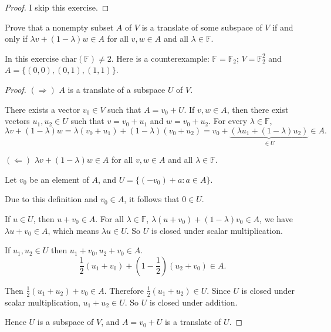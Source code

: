\begin{proof}
    I skip this exercise.
\end{proof}
\newpage

\begin{exercise}
    Prove that a nonempty subset $A$ of $V$ is a translate of some subspace of $V$ if and only if $\lambda v + (1 - \lambda)w\in A$ for all $v, w\in A$ and all $\lambda \in\mathbb{F}$.
\end{exercise}

In this exercise $\text{char}(\mathbb{F})\ne 2$. Here is a counterexample: $\mathbb{F} = \mathbb{F}_{2}$; $V = \mathbb{F}^{2}_{2}$ and $A = \{ (0,0), (0,1), (1,1) \}$.

\begin{proof}
    $(\Rightarrow)$ $A$ is a translate of a subspace $U$ of $V$.

    There exists a vector $v_{0}\in V$ such that $A = v_{0} + U$. If $v, w\in A$, then there exist vectors $u_{1}, u_{2}\in U$ such that $v = v_{0} + u_{1}$ and $w = v_{0} + u_{2}$. For every $\lambda\in\mathbb{F}$,
    \[
        \lambda v + (1 - \lambda)w = \lambda (v_{0} + u_{1}) + (1 - \lambda)(v_{0} + u_{2}) = v_{0} + \underbrace{(\lambda u_{1} + (1 - \lambda)u_{2})}_{\in U} \in A.
    \]

    $(\Leftarrow)$ $\lambda v + (1 - \lambda)w\in A$ for all $v, w\in A$ and all $\lambda \in\mathbb{F}$.

    Let $v_{0}$ be an element of $A$, and $U = \{ (-v_{0}) + a : a\in A \}$.

    Due to this definition and $v_{0}\in A$, it follows that $0\in U$.

    If $u\in U$, then $u + v_{0}\in A$. For all $\lambda\in\mathbb{F}$, $\lambda (u + v_{0}) + (1 - \lambda)v_{0}\in A$, we have $\lambda u + v_{0}\in A$, which means $\lambda u\in U$. So $U$ is closed under scalar multiplication.

    If $u_{1}, u_{2}\in U$ then $u_{1} + v_{0}, u_{2} + v_{0}\in A$.
    \[
        \frac{1}{2}(u_{1} + v_{0}) + \left(1 - \frac{1}{2}\right)(u_{2} + v_{0})\in A.
    \]

    Then $\frac{1}{2}(u_{1} + u_{2}) + v_{0}\in A$. Therefore $\frac{1}{2}(u_{1} + u_{2})\in U$. Since $U$ is closed under scalar multiplication, $u_{1} + u_{2}\in U$. So $U$ is closed under addition.

    Hence $U$ is a subspace of $V$, and $A = v_{0} + U$ is a translate of $U$.
\end{proof}
\newpage

